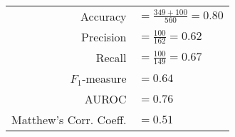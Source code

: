\begin{tabular}{rl}
\rule{0pt}{12pt} Accuracy & $= \frac{349 + 100}{560} = 0.80$  \tabularnewline
\rule{0pt}{12pt} Precision & $= \frac{100}{162} = 0.62$ \tabularnewline
\rule{0pt}{12pt} Recall & $= \frac{100}{149} = 0.67$  \tabularnewline
\rule{0pt}{12pt} $F_1$-measure & $= 0.64$ \tabularnewline
\rule{0pt}{12pt} AUROC &$= 0.76$ \tabularnewline
\rule{0pt}{12pt} Matthew's Corr. Coeff. & $= 0.51$ \tabularnewline
\end{tabular}
